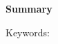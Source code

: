 \cleardoublepage
\newpage
\thispagestyle{empty}
{}



\begin{center}\huge \textbf{Summary}\end{center}


%
%
%
%
%
%
%
%
%
%
%
%
%
%
%
%
%
%
%
%
%
%

\vfill 

\begin{flushleft}
\large

Keywords:
\end{flushleft}



